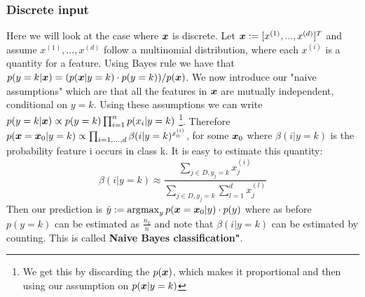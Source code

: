 \subsubsection{Discrete input}
Here we will look at the case where $\bm{x}$ is discrete. Let $\bm{x} := [x^{(1)},...,x^{(d)}]^{T}$ and assume $x^{(1)},...,x^{(d)}$ follow a multinomial distribution, where each $x^{(i)}$ is a quantity for a feature. Using Bayes rule we have that $p(y=k| \bm{x}) = (p(\bm{x}|y=k) \cdot p(y=k)) / p(\bm{x})$. We now introduce our "naive assumptions" which are that all the features in $\bm{x}$ are mutually independent, conditional on $y=k$. Using these assumptions we can write $p(y=k | \bm{x}) \propto p(y=k) \prod_{i=1}^{n} p(x_{i} |y=k)$ \footnote{We get this by discarding the $p(\bm{x})$, which makes it proportional and then using our assumption on $p(\bm{x}|y=k)$}. Therefore $p(\bm{x} = \bm{x}_{0} |y=k) \propto \prod_{i=1,...,d} \beta(i|y=k)^{x_{0}^{(i)}}$, for some $\bm{x}_{0}$ where $\beta(i|y=k)$ is the probability feature i occurs in class k. It is easy to estimate this quantity:
\begin{equation}
    \beta(i|y=k) \approx \frac{\sum_{j \in D, y_{j}=k} x_{j}^{(i)}}{\sum_{j \in D, y_{j}=k} \sum_{l=1}^{d} x_{j}^{(l)}}
\end{equation}
Then our prediction is $\hat{y} := \operatorname*{arg\!\max}_{y} p(\bm{x}=\bm{x}_{0} |y) \cdot p(y)$ where as before $p(y=k)$ can be estimated as $\frac{n_{k}}{n}$ and note that $\beta(i|y=k)$ can be estimated by counting. This is called \textbf{Naive Bayes classification"}.